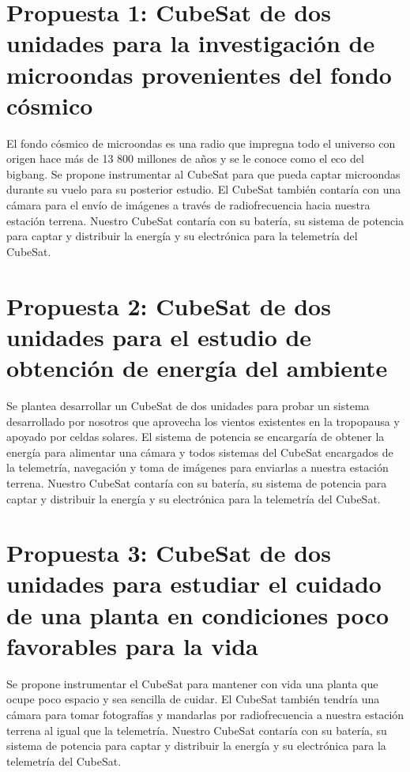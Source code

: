 \documentclass{article}%
\begin{document}
\section*{Propuesta 1: CubeSat de dos unidades para la investigación de microondas provenientes del
fondo cósmico}
\justify
El fondo cósmico de microondas es una radio que impregna todo el universo con origen hace más de 13 800 
millones de años y se le conoce como el eco del bigbang. Se propone instrumentar al CubeSat para que pueda 
captar microondas durante su vuelo para su posterior estudio. El CubeSat también contaría con una cámara 
para el envío de imágenes a través de radiofrecuencia hacia nuestra estación terrena. Nuestro CubeSat contaría 
con su batería, su sistema de potencia para captar y distribuir la energía y su electrónica para la telemetría 
del CubeSat.
\section*{Propuesta 2: CubeSat de dos unidades para el estudio de obtención de energía del ambiente}
\justify
Se plantea desarrollar un CubeSat de dos unidades para probar un sistema desarrollado por nosotros que aprovecha 
los vientos existentes en la tropopausa y apoyado por celdas solares. El sistema de potencia se encargaría de 
obtener la energía para alimentar una cámara y todos sistemas del CubeSat encargados de la telemetría, navegación 
y toma de imágenes para enviarlas a nuestra estación terrena. Nuestro CubeSat contaría 
con su batería, su sistema de potencia para captar y distribuir la energía y su electrónica para la telemetría 
del CubeSat.
\section*{Propuesta 3: CubeSat de dos unidades para estudiar el cuidado de una planta en condiciones poco favorables 
para la vida}
\justify
Se propone instrumentar el CubeSat para mantener con vida una planta que ocupe poco espacio y sea sencilla de cuidar. El 
CubeSat también tendría una cámara para tomar fotografías y mandarlas por radiofrecuencia a nuestra estación terrena al igual 
que la telemetría. Nuestro CubeSat contaría 
con su batería, su sistema de potencia para captar y distribuir la energía y su electrónica para la telemetría 
del CubeSat.
\end{document}
